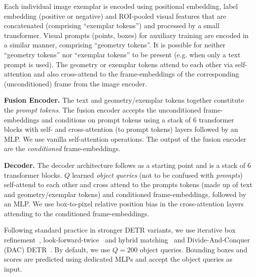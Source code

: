 \documentclass[]{fairmeta}
\renewcommand{\paragraph}[1]{%
	\noindent\textbf{#1.}\noindent\xspace%
}
\begin{document}
Each individual image exemplar is encoded using positional embedding, label embedding (positive or negative) and ROI-pooled visual features that are concatenated (comprising ``exemplar tokens'') and processed by a small transformer. Visual prompts (points, boxes) for auxiliary training are encoded in a similar manner, comprising ``geometry tokens''. It is possible for neither ``geometry tokens'' nor ``exemplar tokens'' to be present (e.g. when only a text prompt is used). The geometry or exemplar tokens attend to each other via self-attention and also cross-attend to the frame-embeddings of the corresponding (unconditioned) frame from the image encoder.

\paragraph{Fusion Encoder} The text and geometry/exemplar tokens together constitute the \textit{prompt tokens}.
The fusion encoder accepts the unconditioned frame-embeddings and conditions on
prompt tokens using a stack of 6 transformer blocks with self- and cross-attention (to prompt tokens) layers followed by an MLP. We use vanilla self-attention operations. The output of the fusion encoder are the \textit{conditioned} frame-embeddings.

\paragraph{Decoder} The decoder architecture follows \cite{carion2020end, kamath2021mdetr} as a starting point and is a stack of 6 transformer blocks. $Q$ learned \textit{object queries} (not to be confused with \textit{prompts}) self-attend to each other and cross attend to the prompts tokens (made up of text and geometry/exemplar tokens) and conditioned frame-embeddings, followed by an MLP. We use box-to-pixel relative position bias \citep{plaindetr} in the cross-attention layers attending to the conditioned frame-embeddings. 

Following standard practice in stronger DETR variants, we use iterative box refinement~\citep{deformabledetr}, look-forward-twice~\citep{dino_detection} and hybrid matching~\citep{jia2022detrs} and Divide-And-Conquer (DAC) DETR~\citep{NEURIPS2023_edd0d433}. By default, we use $Q=200$ object queries. Bounding boxes and scores are predicted using dedicated MLPs and accept the object queries as input.
\end{document}
